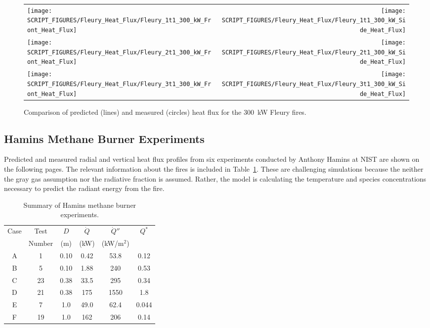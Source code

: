 \begin{figure}[p]
\begin{tabular*}{\textwidth}{l@{\extracolsep{\fill}}r}
\texttt{[image: SCRIPT\_FIGURES/Fleury\_Heat\_Flux/Fleury\_1t1\_300\_kW\_Front\_Heat\_Flux]} &
\texttt{[image: SCRIPT\_FIGURES/Fleury\_Heat\_Flux/Fleury\_1t1\_300\_kW\_Side\_Heat\_Flux]} \\
\texttt{[image: SCRIPT\_FIGURES/Fleury\_Heat\_Flux/Fleury\_2t1\_300\_kW\_Front\_Heat\_Flux]} &
\texttt{[image: SCRIPT\_FIGURES/Fleury\_Heat\_Flux/Fleury\_2t1\_300\_kW\_Side\_Heat\_Flux]} \\
\texttt{[image: SCRIPT\_FIGURES/Fleury\_Heat\_Flux/Fleury\_3t1\_300\_kW\_Front\_Heat\_Flux]} &
\texttt{[image: SCRIPT\_FIGURES/Fleury\_Heat\_Flux/Fleury\_3t1\_300\_kW\_Side\_Heat\_Flux]}
\end{tabular*}
\label{Fleury_Heat_Flux_300_kW}
\caption[Fleury Heat Flux, 300 kW fires.]
{Comparison of predicted (lines) and measured (circles) heat flux for the 300~kW Fleury fires.}
\end{figure}

\clearpage

\subsection{Hamins Methane Burner Experiments}

Predicted and measured radial and vertical heat flux profiles from six experiments conducted by Anthony Hamins at NIST are shown on the following pages. The relevant information about the fires is included in Table~\ref{Hamins_Table}. These are challenging simulations because the neither the gray gas assumption nor the radiative fraction is assumed. Rather, the model is calculating the temperature and species concentrations necessary to predict the radiant energy from the fire.

\begin{table}[ht]
\caption{Summary of Hamins methane burner experiments. }
\begin{center}
\begin{tabular}{|c|c|c|c|c|c|}
\hline
Case     & Test     & $D$  & $\dot{Q}$   &  $\dot{Q}''$   & $Q^*$   \\
         & Number   & (m)  & (kW)        &  (kW/m$^2$)    &         \\ \hline \hline
A        & 1        & 0.10 & 0.42        &  53.8          & 0.12    \\ \hline
B        & 5        & 0.10 & 1.88        &  240           & 0.53    \\ \hline
C        & 23       & 0.38 & 33.5        &  295           & 0.34    \\ \hline
D        & 21       & 0.38 & 175         &  1550          & 1.8     \\ \hline
E        & 7        & 1.0  & 49.0        &  62.4          & 0.044   \\ \hline
F        & 19       & 1.0  & 162         &  206           & 0.14    \\ \hline
\end{tabular}
\end{center}
\label{Hamins_Table}
\end{table}

